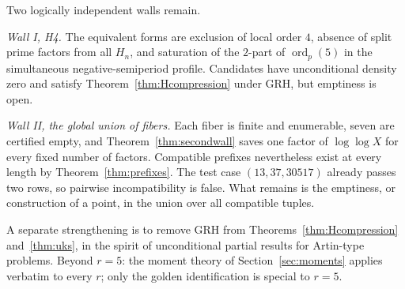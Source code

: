 \documentclass[11pt]{amsart}
\theoremstyle{definition}
\theoremstyle{remark}
\newcommand{\ord}{\operatorname{ord}}
\begin{document}
Two logically independent walls remain.

\emph{Wall I, H4.} The equivalent forms are exclusion of local order \(4\),
absence of split prime factors from all \(H_n\), and saturation of the
\(2\)-part of \(\ord_p(5)\) in the simultaneous negative-semiperiod
profile. Candidates have unconditional density zero and satisfy
Theorem~\ref{thm:Hcompression} under GRH, but emptiness is open.

\emph{Wall II, the global union of fibers.} Each fiber is finite and
enumerable, seven are certified empty, and
Theorem~\ref{thm:secondwall} saves one factor of \(\log\log X\) for every
fixed number of factors. Compatible prefixes nevertheless exist at every
length by Theorem~\ref{thm:prefixes}. The test case
\((13,37,30517)\) already passes two rows, so pairwise incompatibility is
false. What remains is the emptiness, or construction of a point, in the
union over all compatible tuples.

A separate strengthening is to remove GRH from
Theorems~\ref{thm:Hcompression} and~\ref{thm:uks}, in the spirit of
unconditional partial results for Artin-type problems.
Beyond $r = 5$: the moment theory of Section~\ref{sec:moments} applies
verbatim to every $r$; only the golden identification is special
to $r = 5$.
\end{document}
